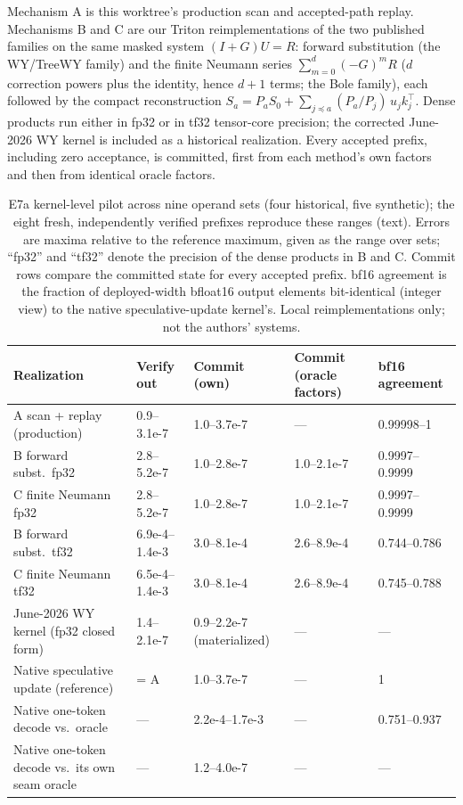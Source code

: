 \documentclass[conference]{IEEEtran}
\begin{document}
Mechanism A is this worktree's production scan and accepted-path replay. Mechanisms B and C are our Triton reimplementations of the two published families on the same masked system $(I+G)U=R$: forward substitution (the WY/TreeWY family) and the finite Neumann series $\sum_{m=0}^{d}(-G)^mR$ ($d$ correction powers plus the identity, hence $d+1$ terms; the Bole family), each followed by the compact reconstruction $S_a=P_aS_0+\sum_{j\preceq a}(P_a/P_j)\,u_jk_j^\top$. Dense products run either in fp32 or in tf32 tensor-core precision; the corrected June-2026 WY kernel is included as a historical realization. Every accepted prefix, including zero acceptance, is committed, first from each method's own factors and then from identical oracle factors.

\begin{table}[t]
\caption{E7a kernel-level pilot across nine operand sets (four historical, five synthetic); the eight fresh, independently verified prefixes reproduce these ranges (text). Errors are maxima relative to the reference maximum, given as the range over sets; ``fp32'' and ``tf32'' denote the precision of the dense products in B and C. Commit rows compare the committed state for every accepted prefix. bf16 agreement is the fraction of deployed-width bfloat16 output elements bit-identical (integer view) to the native speculative-update kernel's. Local reimplementations only; not the authors' systems.}
\label{tab:e7a}
\centering\small
\begin{tabularx}{\textwidth}{@{}p{}YYYY@{}}
\toprule
Realization & Verify out & Commit (own) & Commit (oracle factors) & bf16 agreement \\
\midrule
A scan + replay (production) & 0.9--3.1e-7 & 1.0--3.7e-7 & --- & 0.99998--1 \\
B forward subst.\ fp32 & 2.8--5.2e-7 & 1.0--2.8e-7 & 1.0--2.1e-7 & 0.9997--0.9999 \\
C finite Neumann fp32 & 2.8--5.2e-7 & 1.0--2.8e-7 & 1.0--2.1e-7 & 0.9997--0.9999 \\
B forward subst.\ tf32 & 6.9e-4--1.4e-3 & 3.0--8.1e-4 & 2.6--8.9e-4 & 0.744--0.786 \\
C finite Neumann tf32 & 6.5e-4--1.4e-3 & 3.0--8.1e-4 & 2.6--8.9e-4 & 0.745--0.788 \\
June-2026 WY kernel (fp32 closed form) & 1.4--2.1e-7 & 0.9--2.2e-7 (materialized) & --- & --- \\
\midrule
Native speculative update (reference) & = A & 1.0--3.7e-7 & --- & 1 \\
Native one-token decode vs.\ oracle & --- & 2.2e-4--1.7e-3 & --- & 0.751--0.937 \\
Native one-token decode vs.\ its own seam oracle & --- & 1.2--4.0e-7 & --- & --- \\
\bottomrule
\end{tabularx}
\end{table}
\end{document}
